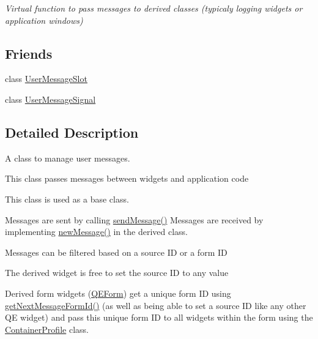 \begin{DoxyCompactItemize}
\begin{DoxyCompactList}\small\item\em Virtual function to pass messages to derived classes (typicaly logging widgets or application windows) \end{DoxyCompactList}\end{DoxyCompactItemize}
\subsection*{Friends}
\begin{DoxyCompactItemize}
\item 
\hypertarget{classUserMessage_acade833d9cce9e3083dffc5cdaae82ed}{
class \hyperlink{classUserMessage_acade833d9cce9e3083dffc5cdaae82ed}{UserMessageSlot}}
\label{classUserMessage_acade833d9cce9e3083dffc5cdaae82ed}

\item 
\hypertarget{classUserMessage_a1d41035daed6a068a2173b8d8e7cf950}{
class \hyperlink{classUserMessage_a1d41035daed6a068a2173b8d8e7cf950}{UserMessageSignal}}
\label{classUserMessage_a1d41035daed6a068a2173b8d8e7cf950}

\end{DoxyCompactItemize}


\subsection{Detailed Description}
A class to manage user messages.

This class passes messages between widgets and application code

This class is used as a base class.

Messages are sent by calling \hyperlink{classUserMessage_ad4287bb64b8f7a8af52db1ad3356a3bf}{sendMessage()} Messages are received by implementing \hyperlink{classUserMessage_aaa90a4f74b724bb1188307bf623f4212}{newMessage()} in the derived class.

Messages can be filtered based on a source ID or a form ID

The derived widget is free to set the source ID to any value

Derived form widgets (\hyperlink{classQEForm}{QEForm}) get a unique form ID using \hyperlink{classUserMessage_a6acc4d4b0bb012d15f1f41d1360452b2}{getNextMessageFormId()} (as well as being able to set a source ID like any other QE widget) and pass this unique form ID to all widgets within the form using the \hyperlink{classContainerProfile}{ContainerProfile} class.

